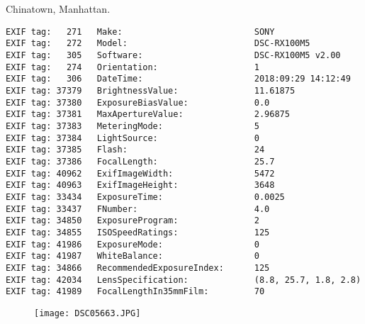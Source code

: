 \section{\protect{}}
\noindent Chinatown, Manhattan.
\noindent
\begin{lstlisting}
EXIF tag:   271   Make:                          SONY
EXIF tag:   272   Model:                         DSC-RX100M5
EXIF tag:   305   Software:                      DSC-RX100M5 v2.00
EXIF tag:   274   Orientation:                   1
EXIF tag:   306   DateTime:                      2018:09:29 14:12:49
EXIF tag: 37379   BrightnessValue:               11.61875
EXIF tag: 37380   ExposureBiasValue:             0.0
EXIF tag: 37381   MaxApertureValue:              2.96875
EXIF tag: 37383   MeteringMode:                  5
EXIF tag: 37384   LightSource:                   0
EXIF tag: 37385   Flash:                         24
EXIF tag: 37386   FocalLength:                   25.7
EXIF tag: 40962   ExifImageWidth:                5472
EXIF tag: 40963   ExifImageHeight:               3648
EXIF tag: 33434   ExposureTime:                  0.0025
EXIF tag: 33437   FNumber:                       4.0
EXIF tag: 34850   ExposureProgram:               2
EXIF tag: 34855   ISOSpeedRatings:               125
EXIF tag: 41986   ExposureMode:                  0
EXIF tag: 41987   WhiteBalance:                  0
EXIF tag: 34866   RecommendedExposureIndex:      125
EXIF tag: 42034   LensSpecification:             (8.8, 25.7, 1.8, 2.8)
EXIF tag: 41989   FocalLengthIn35mmFilm:         70

\end{lstlisting}
\clearpage
\begin{figure}
\raggedleft
\texttt{[image: DSC05663.JPG]}
\end{figure}


\clearpage
